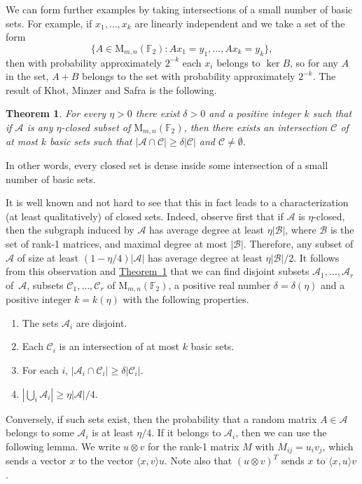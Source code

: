 \documentclass[11pt]{article}
\numberwithin{equation}{section}
\newtheorem{theorem}{Theorem}[section]
\theoremstyle{definition}
\theoremstyle{plain}
\newcommand{\expref}[2]{\hyperref[#2]{#1~\ref{#2}}}
\newcommand\F{\mathbb{F}}
\renewcommand\d{\delta}
\newcommand \cA{\mathcal A}
\newcommand \cB{\mathcal B}
\newcommand \cC{\mathcal C}
\newcommand \mn{\mathrm{M}_{m,n}(\F_2)}
\begin{document}
We can form further examples by taking intersections of a small number of basic sets. For example, if $x_1,\dots,x_k$ are linearly independent and we take a set of the form 
\[\{A\in\mn:Ax_1=y_1,\dots,Ax_k=y_k\},\] 
then with probability approximately $2^{-k}$ each $x_i$ belongs to $\ker B$, so for any $A$ in the set, $A+B$ belongs to the set with probability approximately $2^{-k}$. The result of Khot, Minzer and Safra is the following.

\begin{theorem} \label{KMS}
	For every $\eta>0$ there exist $\delta>0$ and a positive integer $k$ such that if $\cA$ is any  $\eta$-closed subset of $\mn$, then there exists an intersection $\cC$ of at most $k$ basic sets such that $|\cA\cap \cC|\geq\d|\cC|$ and $\cC\neq \emptyset$.
\end{theorem}

\noindent In other words, every closed set is dense inside some intersection of a small number of basic sets.

It is well known and not hard to see that this in fact leads to a characterization (at least qualitatively) of  closed sets. Indeed, observe first that if $\cA$ is  $\eta$-closed, then the subgraph induced by $\cA$ has average degree at least $\eta|\cB|$, where $\cB$ is the set of rank-1 matrices, and maximal degree at most $|\cB|$.
Therefore, any subset of $\cA$ of size at least $(1-\eta/4)|\cA|$ has average degree at least $\eta|\cB|/2$. It follows from this observation and \expref{Theorem}{KMS} that we can find disjoint subsets $\cA_1,\dots,\cA_r$ of~$\cA$, subsets $\cC_1,\dots,\cC_r$ of $\mn$, a positive real number $\d=\d(\eta)$ and a positive integer $k=k(\eta)$ with the following properties.
\begin{enumerate}
	\item The sets $\cA_i$ are disjoint.
	\item Each $\cC_i$ is an intersection of at most $k$ basic sets.
	\item For each $i$, $|\cA_i\cap\cC_i|\geq\d|\cC_i|$.
	\item $|\bigcup_i\cA_i|\geq\eta|\cA|/4$.
\end{enumerate}

\noindent %
Conversely, if such sets exist, then the probability that a random matrix $A\in\cA$ belongs to some $\cA_i$ is at least $\eta/4$. If it belongs to $\cA_i$, then we can use the following lemma. We write $u\otimes v$ for the rank-1 matrix $M$ with $M_{ij}=u_iv_j$, which sends a vector $x$ to the vector $\langle x,v\rangle u$. Note also that $(u\otimes v)^T$ sends $x$ to $\langle x,u\rangle v$.
\end{document}
